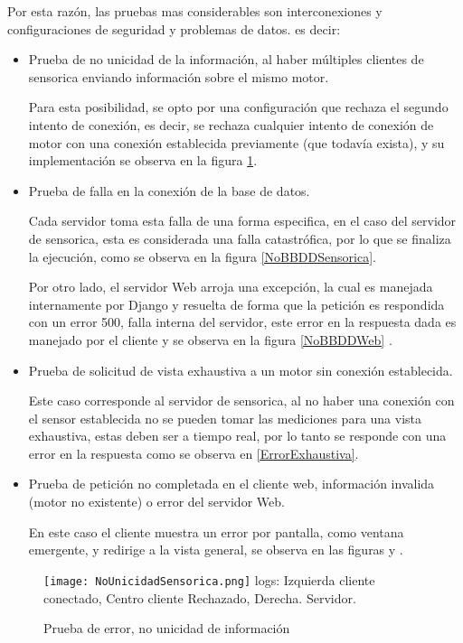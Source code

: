 Por esta razón, las pruebas mas considerables son interconexiones y configuraciones
de seguridad y problemas de datos. es decir:

\begin{itemize}
    \item Prueba de no unicidad de la información, al haber múltiples
        clientes de sensorica enviando información sobre el mismo motor.

        Para esta posibilidad, se opto por una configuración que rechaza el
        segundo intento de conexión, es decir, se rechaza cualquier intento de
        conexión de motor con una conexión establecida previamente (que todavía
        exista), y su implementación se observa en la figura \ref{NoUnicidad}.
%
    \item Prueba de falla en la conexión de la base de datos.

        Cada servidor toma esta falla de una forma especifica, en el caso del
        servidor de sensorica, esta es considerada una falla catastrófica, por
        lo que se finaliza la ejecución, como se observa en la figura
        \ref{NoBBDDSensorica}.

        Por otro lado, el servidor Web arroja una excepción, la cual es manejada
        internamente por Django y resuelta de forma que la petición es respondida
        con un error 500, falla interna del servidor, este error en la respuesta
        dada es manejado por el cliente y se observa en la figura
        \ref{NoBBDDWeb} .
%
    \item Prueba de solicitud de vista exhaustiva a un motor sin conexión
        establecida.

        Este caso corresponde al servidor de sensorica, al no haber una conexión
        con el sensor establecida no se pueden tomar las mediciones para una vista
        exhaustiva, estas deben ser a tiempo real, por lo tanto se responde
        con una error en la respuesta como se observa en \ref{ErrorExhaustiva}.
%
    \item Prueba de petición no completada en el cliente web,
        información invalida (motor no existente) o error del servidor Web.

        En este caso el cliente muestra un error por pantalla, como ventana
        emergente, y redirige a la vista general, se observa en las figuras y  .
\end{itemize}


	\begin{figure}[htb]
		\centering
        \caption{Prueba de error, no unicidad de información}
        \texttt{[image: NoUnicidadSensorica.png]}
        logs: Izquierda cliente conectado, Centro cliente Rechazado, Derecha.
        Servidor.
        \label{NoUnicidad}
	\end{figure}

